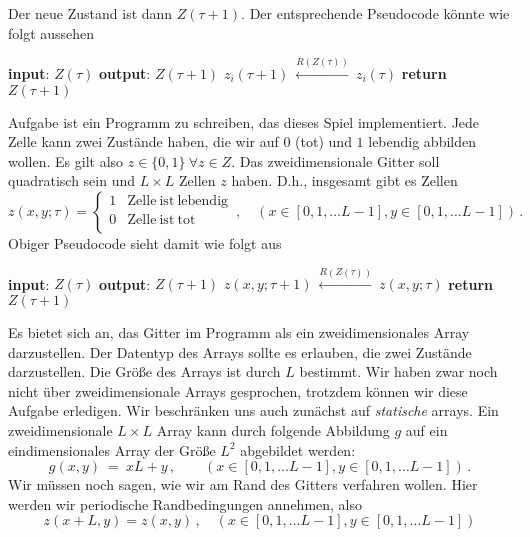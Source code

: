 \documentclass{article}[12pt]
\begin{document}
Der neue Zustand ist dann $Z(\tau+1)$. 
Der entsprechende Pseudocode könnte wie folgt aussehen
\begin{algorithmic}[1]
  \State \textbf{input}: $Z(\tau)$
  \State \textbf{output}: $Z(\tau+1)$
  \State $z_i(\tau+1)\ \stackrel{R(Z(\tau))}{\longleftarrow}\ z_i(\tau)$
  \EndFor
  \State \textbf{return} $Z(\tau+1)$
  \EndProcedure
\end{algorithmic}
Aufgabe ist ein Programm zu schreiben, das dieses Spiel implementiert.
Jede Zelle kann zwei Zustände haben, die wir auf $0$ (tot) und $1$ lebendig abbilden wollen.
Es gilt also $z \in \{0,1\}\ \forall z\in Z$.
Das zweidimensionale Gitter soll quadratisch sein und $L\times L$ Zellen $z$ haben.
D.h., insgesamt gibt es Zellen
\begin{equation}
  z(x,y; \tau) = \begin{cases}
    1 & \mathrm{Zelle~ist~lebendig} \\0  & \mathrm{Zelle~ist~tot} \\
  \end{cases}
  \,,\quad (x\in[0,1,\ldots L-1], y\in[0,1,\ldots L-1])\,.
\end{equation}
Obiger Pseudocode sieht damit wie folgt aus
\begin{algorithmic}[1]
  \State \textbf{input}: $Z(\tau)$
  \State \textbf{output}: $Z(\tau+1)$
  \State $z(x,y; \tau+1)\ \stackrel{R(Z(\tau))}{\longleftarrow}\ z(x,y; \tau)$
  \EndFor
  \EndFor
  \State \textbf{return} $Z(\tau+1)$
  \EndProcedure
\end{algorithmic}
Es bietet sich an, das Gitter im Programm als ein zweidimensionales Array darzustellen.
Der Datentyp des Arrays sollte es erlauben, die zwei Zustände darzustellen.
Die Größe des Arrays ist durch $L$ bestimmt.
Wir haben zwar noch nicht über zweidimensionale Arrays gesprochen, trotzdem können wir diese Aufgabe erledigen. 
Wir beschränken uns auch zunächst auf \emph{statische} arrays.
Ein zweidimensionale $L\times L$ Array kann durch folgende Abbildung $g$ auf ein eindimensionales Array der Größe $L^2$ abgebildet werden:
\begin{equation}
  g(x,y)\ =\ xL + y\,,\qquad (x\in[0,1,\ldots L-1], y\in[0,1,\ldots L-1])\,.
\end{equation}
Wir müssen noch sagen, wie wir am Rand des Gitters verfahren wollen.
Hier werden wir periodische Randbedingungen annehmen, also
\begin{equation}
  z(x+L,y)= z(x,y)\,,\quad (x\in[0,1,\ldots L-1], y\in[0,1,\ldots L-1])
\end{equation}
\end{document}
